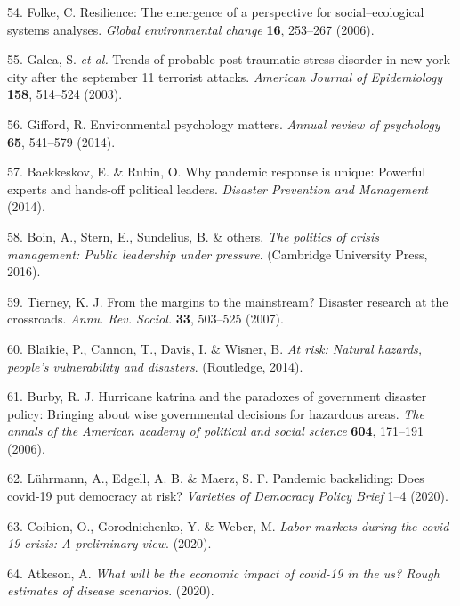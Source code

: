 \documentclass[
]{article}
\newenvironment{cslreferences}%
  {}%
  {\par}
\begin{document}
\begin{cslreferences}
\leavevmode\hypertarget{ref-folke2006resilience}{}%
54. Folke, C. Resilience: The emergence of a perspective for social--ecological systems analyses. \emph{Global environmental change} \textbf{16}, 253--267 (2006).

\leavevmode\hypertarget{ref-galea2003trends}{}%
55. Galea, S. \emph{et al.} Trends of probable post-traumatic stress disorder in new york city after the september 11 terrorist attacks. \emph{American Journal of Epidemiology} \textbf{158}, 514--524 (2003).

\leavevmode\hypertarget{ref-gifford2014environmental}{}%
56. Gifford, R. Environmental psychology matters. \emph{Annual review of psychology} \textbf{65}, 541--579 (2014).

\leavevmode\hypertarget{ref-baekkeskov2014pandemic}{}%
57. Baekkeskov, E. \& Rubin, O. Why pandemic response is unique: Powerful experts and hands-off political leaders. \emph{Disaster Prevention and Management} (2014).

\leavevmode\hypertarget{ref-boin2016politics}{}%
58. Boin, A., Stern, E., Sundelius, B. \& others. \emph{The politics of crisis management: Public leadership under pressure}. (Cambridge University Press, 2016).

\leavevmode\hypertarget{ref-tierney2007margins}{}%
59. Tierney, K. J. From the margins to the mainstream? Disaster research at the crossroads. \emph{Annu. Rev. Sociol.} \textbf{33}, 503--525 (2007).

\leavevmode\hypertarget{ref-blaikie2014risk}{}%
60. Blaikie, P., Cannon, T., Davis, I. \& Wisner, B. \emph{At risk: Natural hazards, people's vulnerability and disasters}. (Routledge, 2014).

\leavevmode\hypertarget{ref-burby2006hurricane}{}%
61. Burby, R. J. Hurricane katrina and the paradoxes of government disaster policy: Bringing about wise governmental decisions for hazardous areas. \emph{The annals of the American academy of political and social science} \textbf{604}, 171--191 (2006).

\leavevmode\hypertarget{ref-luhrmann2020}{}%
62. Lührmann, A., Edgell, A. B. \& Maerz, S. F. Pandemic backsliding: Does covid-19 put democracy at risk? \emph{Varieties of Democracy Policy Brief} 1--4 (2020).

\leavevmode\hypertarget{ref-coibion2020labor}{}%
63. Coibion, O., Gorodnichenko, Y. \& Weber, M. \emph{Labor markets during the covid-19 crisis: A preliminary view}. (2020).

\leavevmode\hypertarget{ref-atkeson2020will}{}%
64. Atkeson, A. \emph{What will be the economic impact of covid-19 in the us? Rough estimates of disease scenarios}. (2020).


\end{cslreferences}
\end{document}
